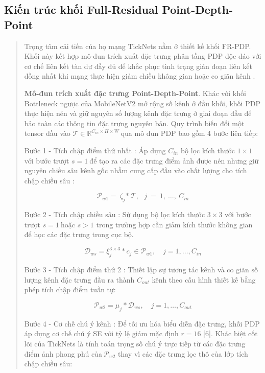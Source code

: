 \documentclass[
  12pt,
  a4paper,
]{report}
\begin{document}
\subsection{Kiến trúc khối Full-Residual
Point-Depth-Point}\label{kiux1ebfn-truxfac-khux1ed1i-full-residual-point-depth-point}

\begin{quote}
Trọng tâm cải tiến của họ mạng TickNets nằm ở thiết kế khối FR-PDP. Khối
này kết hợp mô-đun trích xuất đặc trưng phân tầng PDP độc đáo với cơ chế
liên kết tàn dư đầy đủ để khắc phục tình trạng gián đoạn liên kết đồng
nhất khi mạng thực hiện giảm chiều không gian hoặc co giãn kênh .

\textbf{Mô-đun trích xuất đặc trưng Point-Depth-Point}. Khác với khối
Bottleneck ngược của MobileNetV2 mở rộng số kênh ở đầu khối, khối PDP
thực hiện nén và giữ nguyên số lượng kênh đặc trưng ở giai đoạn đầu để
bảo toàn các thông tin đặc trưng nguyên bản. Quy trình biến đổi một
tensor đầu vào
\(\mathcal{T \in}\mathbb{R}^{C_{in} \times H \times W}\ \)qua mô đun PDP
bao gồm 4 bước liên tiếp:

Bước 1 - Tích chập điểm thứ nhất : Áp dụng \(C_{in}\) bộ lọc kích thước
\(1 \times 1\) với bước trượt \(s = 1\ \)để tạo ra các đặc trưng điểm
ảnh được nén nhưng giữ nguyên chiều sâu kênh gốc nhằm cung cấp đầu vào
chất lượng cho tích chập chiều sâu :

\[\mathcal{P}_{w1} = \ \zeta_{j}\mathcal{*\ T,\ \ \ }j\  = \ 1,\ \ldots,\ C_{in}\]

Bước 2 - Tích chập chiều sâu : Sử dụng bộ lọc kích thước \(3 \times 3\)
với bước trượt \(s = 1\ \)hoặc \(s > 1\) trong trường hợp cần giảm kích
thước không gian để học các đặc trưng trong cục bộ.

\[\mathcal{D}_{ws} = \xi_{j}^{3 \times 3}*c_{j} \in \mathcal{P}_{w1},\quad j = 1,\ldots,C_{in}\]

Bước 3 - Tích chập điểm thứ 2 : Thiết lập sự tương tác kênh và co giãn
số lượng kênh đặc trưng đầu ra thành \(C_{out}\) kênh theo cấu hình
thiết kế bằng phép tích chập điểm tuần tự:

\[\mathcal{P}_{w2} = \mu_{j}*\mathcal{D}_{ws},\quad j = 1,\ldots,C_{out}\]

Bước 4 - Cơ chế chú ý kênh : Để tối ưu hóa biểu diễn đặc trưng, khối PDP
áp dụng cơ chế chú ý SE với tỷ lệ giảm mặc định \(r = 16\) {[}6{]}. Khác
biệt cốt lõi của TickNets là tính toán trọng số chú ý trực tiếp từ các
đặc trưng điểm ảnh phong phú của\(\mathcal{\ P}_{w2}\) thay vì các đặc
trưng lọc thô của lớp tích chập chiều sâu:


\end{quote}
\end{document}
